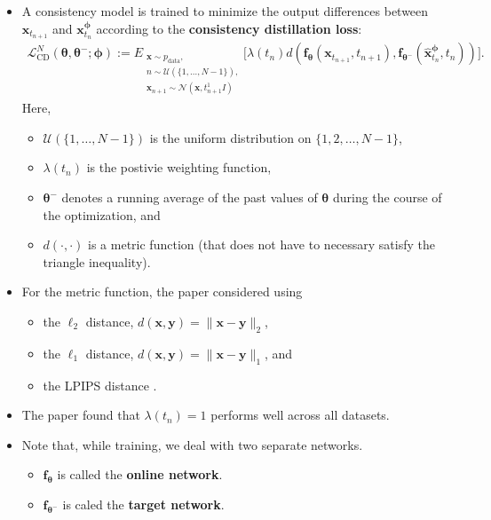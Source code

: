 \documentclass[10pt]{article}
\newcommand{\ve}[1]{\mathbf{#1}}
\newcommand{\ves}[1]{\boldsymbol{#1}}
\newcommand{\mrm}[1]{\mathrm{#1}}
\newcommand{\mcal}[1]{\mathcal{#1}}
\newcommand{\data}{\mathrm{data}}
\begin{document}
\begin{itemize}
  \item A consistency model is trained to minimize the output differences between $\ve{x}_{t_{n+1}}$ and $\ve{x}_{t_n}^{\ves{\phi}}$ according to the {\bf consistency distillation loss}:
  \begin{align*}
    \mcal{L}_{\mrm{CD}}^N(\ves{\theta},\ves{\theta}^-;\ves{\phi}) := E_{\substack{\ve{x} \sim p_{\data},\\n \sim \mcal{U}(\{ 1, \dotsc, N-1\}),\\ \ve{x}_{n+1} \sim \mcal{N}(\ve{x},t_{n+1}^1I)}}\Big[\lambda(t_n) d(\ve{f}_{\ves{\theta}}(\ve{x}_{t_{n+1}}, t_{n+1}), \ve{f}_{\ves{\theta}^-}(\hat{\ve{x}}_{t_n}^{\ves{\phi}}, t_{n}))\Big].
  \end{align*}
  Here,
  \begin{itemize}
    \item $\mcal{U}(\{ 1, \dotsc, N-1\})$ is the uniform distribution on $\{ 1, 2, \dotsc, N-1 \}$,
    \item $\lambda(t_n)$ is the postivie weighting function,
    \item $\ves{\theta}^-$ denotes a running average of the past values of $\ves{\theta}$ during the course of the optimization, and
    \item $d(\cdot, \cdot)$ is a metric function (that does not have to necessary satisfy the triangle inequality).
  \end{itemize}

  \item For the metric function, the paper considered using
  \begin{itemize}
    \item the $\ell_2$ distance, $d(\ve{x},\ve{y}) = \| \ve{x} - \ve{y} \|_2$,
    \item the $\ell_1$ distance, $d(\ve{x},\ve{y}) = \| \ve{x} - \ve{y} \|_1$, and
    \item the LPIPS distance \cite{Zhang:2018}.
  \end{itemize}

  \item The paper found that $\lambda(t_n) = 1$ performs well across all datasets.
  
  \item Note that, while training, we deal with two separate networks.
  \begin{itemize}
    \item $\ve{f}_{\ves{\theta}}$ is called the {\bf online network}.
    \item $\ve{f}_{\ves{\theta}^-}$ is caled the {\bf target network}.
  \end{itemize}
  

\end{itemize}
\end{document}
